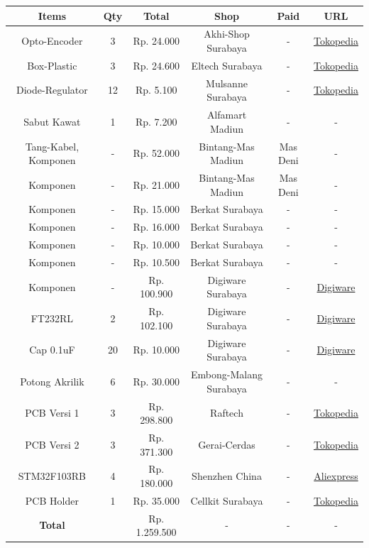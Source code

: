 \documentclass{article} %
\begin{document}
	\begin{table}[H]
	\centering
	\begin{tabular}{|c|c|c|c|c|c|}
		\hline
		Items & Qty & Total & Shop & Paid & URL \\
		\hline
		Opto-Encoder & 3 & Rp. 24.000 & Akhi-Shop Surabaya &  - & \hyperlink{https://www.tokopedia.com/akhishop/opto-coupler-encoder-sensor-module}{Tokopedia} \\
		Box-Plastic & 3 & Rp. 24.600 & Eltech Surabaya & - & \hyperlink{https://www.tokopedia.com/eltech-online/box-electronic-instrument-project-plastic-03-15-cream-40x84x142mm}{Tokopedia} \\
		Diode-Regulator & 12 & Rp. 5.100 & Mulsanne Surabaya & - & \hyperlink{https://www.tokopedia.com/mulsanne/ic-ams1117-5-volt-step-down-smd-800ma}{Tokopedia} \\
		Sabut Kawat & 1 & Rp. 7.200 & Alfamart Madiun & - & - \\
		Tang-Kabel, Komponen & - & Rp. 52.000 & Bintang-Mas Madiun & Mas Deni & - \\
		Komponen & - & Rp. 21.000 & Bintang-Mas Madiun & Mas Deni & - \\
		Komponen & - & Rp. 15.000 & Berkat Surabaya & - & - \\
		Komponen & - & Rp. 16.000 & Berkat Surabaya & - & - \\
		Komponen & - & Rp. 10.000 & Berkat Surabaya & - & - \\
		Komponen & - & Rp. 10.500 & Berkat Surabaya & - & - \\
		Komponen & - & Rp. 100.900 & Digiware Surabaya & - & \hyperlink{https://digiwarestore.com/id/}{Digiware} \\
		FT232RL & 2 & Rp. 102.100 & Digiware Surabaya & - & \hyperlink{https://digiwarestore.com/id/serial-communication/ft232rl-166019.html}{Digiware} \\
		Cap 0.1uF & 20 & Rp. 10.000 & Digiware Surabaya & - & \hyperlink{https://digiwarestore.com/id/smd-capacitor/01uf-50v-10-0805-t-241110.html}{Digiware} \\
		Potong Akrilik & 6 & Rp. 30.000 & Embong-Malang Surabaya & - & - \\
		PCB Versi 1 & 3 & Rp. 298.800 & Raftech & - & \hyperlink{https://www.tokopedia.com/raftech/jasa-cetak-pcb-double-layer-fr4-full-masking-jalur-masking-silkscreen}{Tokopedia} \\
		PCB Versi 2 & 3 & Rp. 371.300 & Gerai-Cerdas & - & \hyperlink{https://www.tokopedia.com/geraicerdas/cetak-pcb-1-keping-single-double-layer-rapid-prototyping-satuan}{Tokopedia} \\
		STM32F103RB & 4 & Rp. 180.000 & Shenzhen China & - & \hyperlink{https://id.aliexpress.com/item/1005002651134172.html}{Aliexpress} \\
		PCB Holder & 1 & Rp. 35.000 & Cellkit Surabaya & - & \hyperlink{https://www.tokopedia.com/cellkit/cellkit-penjepit-papan-pcb-single-per-pcb-holder}{Tokopedia} \\
		\hline
		\textbf{Total} & & Rp. 1.259.500 & - & - & - \\
		\hline
	\end{tabular}
	\end{table}
\end{document}
